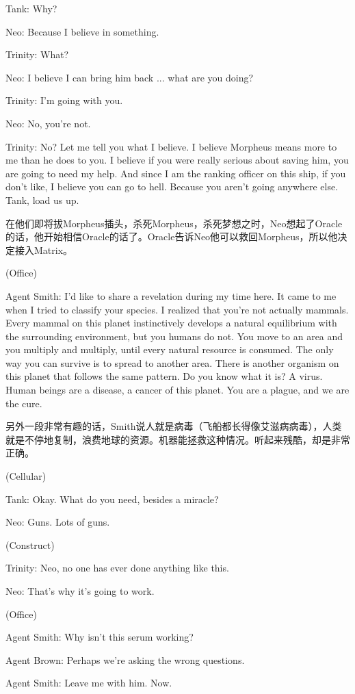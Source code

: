 \documentclass{ctexart}
\newenvironment{myquote}{\color{green} \setlength{\leftskip}{6em} \setlength{\rightskip}{4em} \setlength{\parindent}{-2em}}{\par}
\begin{document}
\begin{myquote}
Tank: Why?

Neo: Because I believe in something.

Trinity: What?

Neo: I believe I can bring him back ... what are you doing?

Trinity: I'm going with you.

Neo: No, you're not.

Trinity: No? Let me tell you what I believe. I believe Morpheus means more to me than he does to you. I believe if you were really serious about saving him, you are going to need my help. And since I am the ranking officer on this ship, if you don't like, I believe you can go to hell. Because you aren't going anywhere else. Tank, load us up.
\end{myquote}

在他们即将拔Morpheus插头，杀死Morpheus，杀死梦想之时，Neo想起了Oracle的话，他开始相信Oracle的话了。Oracle告诉Neo他可以救回Morpheus，所以他决定接入Matrix。

\begin{myquote}
(Office)

Agent Smith: I'd like to share a revelation during my time here. It came to me when I tried to classify your species. I realized that you're not actually mammals. Every mammal on this planet instinctively develops a natural equilibrium with the surrounding environment, but you humans do not. You move to an area and you multiply and multiply, until every natural resource is consumed. The only way you can survive is to spread to another area. There is another organism on this planet that follows the same pattern. Do you know what it is? A virus. Human beings are a disease, a cancer of this planet. You are a plague, and we are the cure.
\end{myquote}

另外一段非常有趣的话，Smith说人就是病毒（飞船都长得像艾滋病病毒），人类就是不停地复制，浪费地球的资源。机器能拯救这种情况。听起来残酷，却是非常正确。

\begin{myquote}
(Cellular)

Tank: Okay. What do you need, besides a miracle?

Neo: Guns. Lots of guns.

(Construct)

Trinity: Neo, no one has ever done anything like this.

Neo: That's why it's going to work.

(Office)

Agent Smith: Why isn't this serum working?

Agent Brown: Perhaps we're asking the wrong questions.

Agent Smith: Leave me with him. Now.
\end{myquote}
\end{document}
